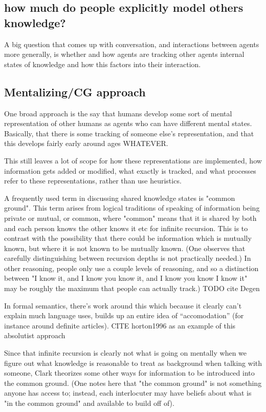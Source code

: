 \documentclass[]{article}
\begin{document}
\subsection{how much do people explicitly model others knowledge?}

A big question that comes up with conversation, and interactions between agents more generally, is whether and how agents are tracking other agents internal states of knowledge and how this factors into their interaction. 

\subsection{Mentalizing/CG approach}
One broad approach is the say that humans develop some sort of mental representation of other humans as agents who can have different mental states. Basically, that there is some tracking of someone else's representation, and that this develops fairly early around ages WHATEVER. 

This still leaves a lot of scope for how these representations are implemented, how information gets added or modified, what exactly is tracked, and what processes refer to these representations, rather than use heuristics. 

A frequently used term in discussing shared knowledge states is "common ground". This term arises from logical traditions of speaking of information being private or mutual, or common, where "common" means that it is shared by both and each person knows the other knows it etc for infinite recursion. This is to contrast with the possibility that there could be information which is mutually known, but where it is not known to be mutually known. (One observes that carefully distinguishing between recursion depths is not practically needed.) In other reasoning, people only use a couple levels of reasoning, and so a distinction between "I know it, and I know you know it, and I know you know I know it" may be roughly the maximum that people can actually track.) TODO cite Degen

In formal semantics, there's work around this which because it clearly can't explain much language uses, builds up an entire idea of ``accomodation'' (for instance around definite articles). 
CITE horton1996 as an example of this absolutist approach

Since that infinite recursion is clearly not what is going on mentally when we figure out what knowledge is reasonable to treat as background when talking with someone, Clark theorizes some other ways for information to be introduced into the common ground. (One notes here that "the common ground" is not something anyone has access to; instead, each interlocuter may have beliefs about what is "in the common ground" and available to build off of). 
\end{document}
